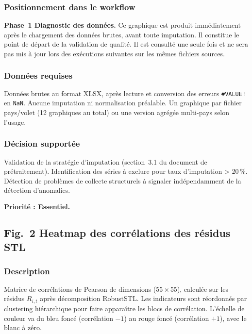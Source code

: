 \documentclass[12pt,a4paper]{article}
\begin{document}
\subsubsection{Positionnement dans le workflow}

\textbf{Phase~1  Diagnostic des données.} Ce graphique est produit
immédiatement après le chargement des données brutes, avant toute
imputation. Il constitue le point de départ de la validation de qualité.
Il est consulté une seule fois et ne sera pas mis à jour lors des exécutions
suivantes sur les mêmes fichiers sources.

\subsubsection{Données requises}

Données brutes au format XLSX, après lecture et conversion des erreurs
\texttt{\#VALUE!} en \texttt{NaN}. Aucune imputation ni normalisation
préalable. Un graphique par fichier pays/volet (12 graphiques au total)
ou une version agrégée multi-pays selon l'usage.

\subsubsection{Décision supportée}

Validation de la stratégie d'imputation (section~3.1 du document de
prétraitement). Identification des séries à exclure pour taux
d'imputation > 20\,\%. Détection de problèmes de collecte structurels
à signaler indépendamment de la détection d'anomalies.

\textbf{Priorité : Essentiel.}

\subsection{Fig.~2  Heatmap des corrélations des résidus STL}

\subsubsection{Description}

Matrice de corrélations de Pearson de dimensions ($55 \times 55$), calculée
sur les résidus $R_{i,t}$ après décomposition RobustSTL. Les indicateurs
sont réordonnés par clustering hiérarchique pour faire apparaître les blocs
de corrélation. L'échelle de couleur va du bleu foncé (corrélation $-1$)
au rouge foncé (corrélation $+1$), avec le blanc à zéro.
\end{document}
